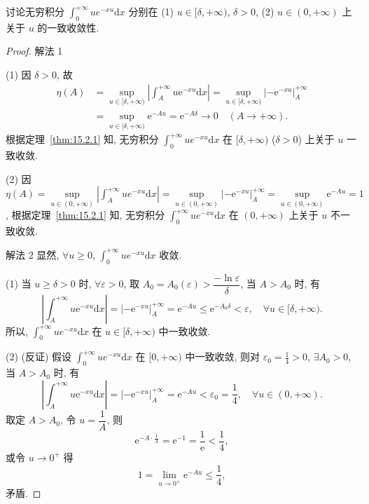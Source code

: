 \begin{example}\label{ex:15.2.1}
讨论无穷积分 $\displaystyle\int_{0}^{+\infty}ue^{-xu}\mathrm{d}x$ 分别在 (1) $u\in[\delta,+\infty)$, $\delta>0$, (2) $u\in(0,+\infty)$ 上关于 $u$ 的一致收敛性.
\end{example}

\begin{proof}
解法 1

(1) 因 $\delta>0$, 故
\[
  \begin{aligned}
    \eta(A)&=\sup_{u\in[\delta,+\infty)}\left|\int_{A}^{+\infty}u\mathrm{e}^{-xu}\mathrm{d}x\right|=\sup_{u\in[\delta,+\infty)}\left|-\mathrm{e}^{-xu}\right|_{A}^{+\infty}\\
    &=\sup_{u\in[\delta,+\infty)}\mathrm{e}^{-Au}=\mathrm{e}^{-A\delta}\to0\quad(A\to+\infty).
  \end{aligned}
\]
根据定理~\ref{thm:15.2.1} 知, 无穷积分 $\displaystyle\int_{0}^{+\infty}ue^{-xu}\mathrm{d}x$ 在 $[\delta,+\infty)$ ($\delta>0$) 上关于 $u$ 一致收敛.

(2) 因 $\eta(A)=\sup\limits_{u\in(0,+\infty)}\left|\int_{A}^{+\infty}ue^{-xu}\mathrm{d}x\right|=\sup\limits_{u\in(0,+\infty)}\left|-\mathrm{e}^{-xu}\right|_{A}^{+\infty}=\sup\limits_{u\in(0,+\infty)}\mathrm{e}^{-Au}=1$,
根据定理~\ref{thm:15.2.1} 知, 无穷积分 $\displaystyle\int_{0}^{+\infty}ue^{-xu}\mathrm{d}x$ 在 $(0,+\infty)$ 上关于 $u$ 不一致收敛.

解法 2 显然, $\forall u\geqslant0$, $\displaystyle\int_{0}^{+\infty}ue^{-xu}\mathrm{d}x$ 收敛.

(1) 当 $u\geqslant\delta>0$ 时, $\forall\varepsilon>0$, 取 $A_{0}=A_{0}(\varepsilon)>\dfrac{-\ln\varepsilon}{\delta}$, 当 $A>A_{0}$ 时, 有
\[
  \left|\int_{A}^{+\infty}u\mathrm{e}^{-xu}\mathrm{d}x\right|=\left|-\mathrm{e}^{-xu}\right|_{A}^{+\infty}=\mathrm{e}^{-Au}\leqslant\mathrm{e}^{-A_{0}\delta}<\varepsilon,\quad\forall u\in[\delta,+\infty).
\]
所以, $\displaystyle\int_{0}^{+\infty}ue^{-xu}\mathrm{d}x$ 在 $u\in[\delta,+\infty)$ 中一致收敛.

(2) (反证) 假设 $\displaystyle\int_{0}^{+\infty}ue^{-xu}\mathrm{d}x$ 在 $[0,+\infty)$ 中一致收敛, 则对 $\varepsilon_{0}=\frac{1}{4}>0$, $\exists A_{0}>0$, 当 $A>A_{0}$ 时, 有
\[
  \left|\int_{A}^{+\infty}u\mathrm{e}^{-xu}\mathrm{d}x\right|=\left|-\mathrm{e}^{-xu}\right|_{A}^{+\infty}=\mathrm{e}^{-Au}<\varepsilon_{0}=\frac{1}{4},\quad\forall u\in(0,+\infty).
\]
取定 $A>A_{0}$, 令 $u=\dfrac{1}{A}$, 则
\[
  \mathrm{e}^{-A\cdot\frac{1}{A}}=\mathrm{e}^{-1}=\frac{1}{\mathrm{e}}<\frac{1}{4},
\]
或令 $u\to0^{+}$ 得
\[
  1=\lim_{u\to0^{+}}\mathrm{e}^{-Au}\leqslant\frac{1}{4},
\]
矛盾.
\end{proof}

